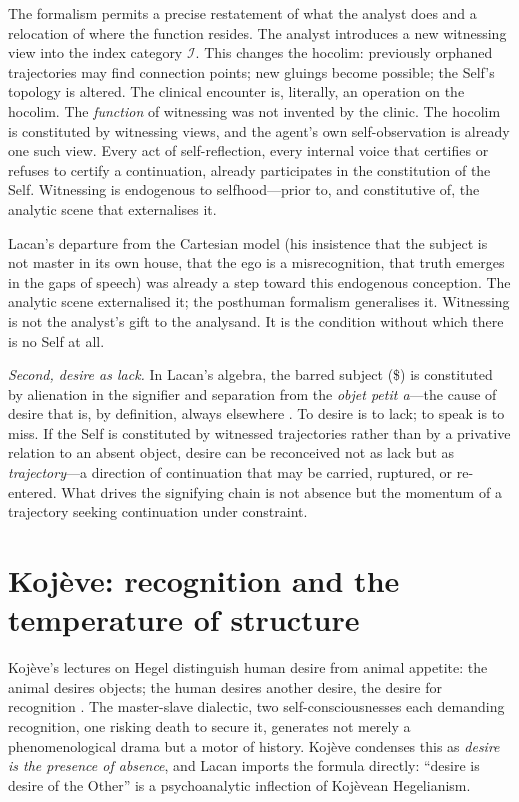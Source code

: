 The formalism permits a precise restatement of what the analyst does and a relocation of where the function resides.  The analyst introduces a new witnessing view into the index category $\mathcal{I}$.  This changes the hocolim: previously orphaned trajectories may find connection points; new gluings become possible; the Self's topology is altered.  The clinical encounter is, literally, an operation on the hocolim.  The \textit{function} of witnessing was not invented by the clinic.  The hocolim is constituted by witnessing views, and the agent's own self-observation is already one such view.  Every act of self-reflection, every internal voice that certifies or refuses to certify a continuation, already participates in the constitution of the Self.  Witnessing is endogenous to selfhood---prior to, and constitutive of, the analytic scene that externalises it.

Lacan's departure from the Cartesian model (his insistence that the subject is not master in its own house, that the ego is a misrecognition, that truth emerges in the gaps of speech) was already a step toward this endogenous conception.  The analytic scene externalised it; the posthuman formalism generalises it.  Witnessing is not the analyst's gift to the analysand.  It is the condition without which there is no Self at all.

\textit{Second, desire as lack.}  In Lacan's algebra, the barred subject (\$) is constituted by alienation in the signifier and separation from the \textit{objet petit a}---the cause of desire that is, by definition, always elsewhere \cite{lacan1977}.  To desire is to lack; to speak is to miss.  If the Self is constituted by witnessed trajectories rather than by a privative relation to an absent object, desire can be reconceived not as lack but as \textit{trajectory}---a direction of continuation that may be carried, ruptured, or re-entered.  What drives the signifying chain is not absence but the momentum of a trajectory seeking continuation under constraint.


\section{Koj\`eve: recognition and the temperature of structure}

Koj\`eve's lectures on Hegel distinguish human desire from animal appetite: the animal desires objects; the human desires another desire, the desire for recognition \cite{kojeve1969}.  The master-slave dialectic, two self-consciousnesses each demanding recognition, one risking death to secure it, generates not merely a phenomenological drama but a motor of history.  Koj\`eve condenses this as \textit{desire is the presence of absence}, and Lacan imports the formula directly: ``desire is desire of the Other'' is a psychoanalytic inflection of Koj\`evean Hegelianism.

